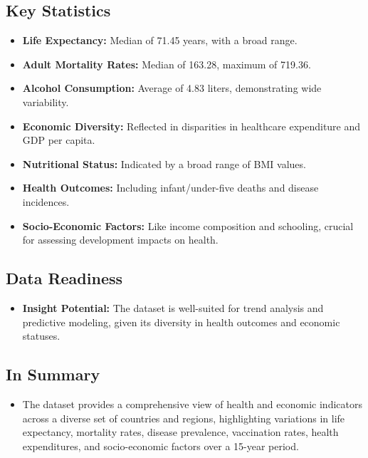 \documentclass[
]{article}
\providecommand{\tightlist}{%
  \setlength{\itemsep}{0pt}\setlength{\parskip}{0pt}}
\begin{document}
\hypertarget{key-statistics}{%
\subsection{Key Statistics}\label{key-statistics}}

\begin{itemize}
\tightlist
\item
  \textbf{Life Expectancy:} Median of 71.45 years, with a broad range.
\item
  \textbf{Adult Mortality Rates:} Median of 163.28, maximum of 719.36.
\item
  \textbf{Alcohol Consumption:} Average of 4.83 liters, demonstrating
  wide variability.
\item
  \textbf{Economic Diversity:} Reflected in disparities in healthcare
  expenditure and GDP per capita.
\item
  \textbf{Nutritional Status:} Indicated by a broad range of BMI values.
\item
  \textbf{Health Outcomes:} Including infant/under-five deaths and
  disease incidences.
\item
  \textbf{Socio-Economic Factors:} Like income composition and
  schooling, crucial for assessing development impacts on health.
\end{itemize}

\hypertarget{data-readiness}{%
\subsection{Data Readiness}\label{data-readiness}}

\begin{itemize}
\tightlist
\item
  \textbf{Insight Potential:} The dataset is well-suited for trend
  analysis and predictive modeling, given its diversity in health
  outcomes and economic statuses.
\end{itemize}

\hypertarget{in-summary}{%
\subsection{In Summary}\label{in-summary}}

\begin{itemize}
\tightlist
\item
  The dataset provides a comprehensive view of health and economic
  indicators across a diverse set of countries and regions, highlighting
  variations in life expectancy, mortality rates, disease prevalence,
  vaccination rates, health expenditures, and socio-economic factors
  over a 15-year period.
\end{itemize}
\end{document}
